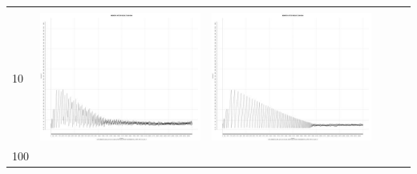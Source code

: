 \begin{table}[htbp]
{\begin{tabular}{l | ccccc}
\begin{minipage}{.15\textwidth}
    				 \end{minipage}\\			
		10	   & \begin{minipage}{.15\textwidth}
     			 	\includegraphics[width=\linewidth]{images/mema-triple/I2}
    				\end{minipage}
    			   & \begin{minipage}{.15\textwidth}
     			 	\includegraphics[width=\linewidth]{images/mema-triple/I6}
    				 \end{minipage}\\		
		100	   & \begin{minipage}{.15\textwidth}

\end{minipage}
\end{tabular}}
\end{table}

